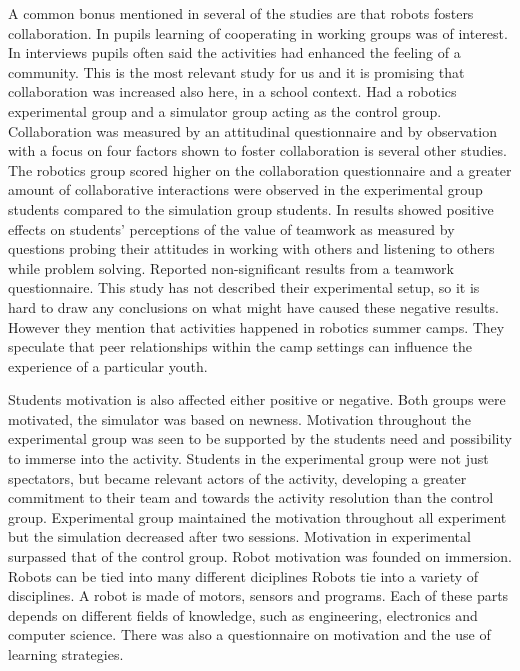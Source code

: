 A common bonus mentioned in several of the studies are that robots fosters collaboration. In \cite{lindh2007does} pupils learning of cooperating in working groups was of interest. In interviews pupils often said the activities had enhanced the feeling of a community. This is the most relevant study for us and it is promising that collaboration was increased also here, in a school context. \cite{mitnik2009collaborative} Had a robotics experimental group and a simulator group acting as the control group. Collaboration was measured by an attitudinal questionnaire and by observation with a focus on four factors shown to foster collaboration is several other studies. The robotics group scored higher on the collaboration questionnaire and a greater amount of collaborative interactions were observed in the experimental group students compared to the simulation group students. In \cite{nugent2008effect} results showed positive effects on students' perceptions of the value of teamwork as measured by questions probing their attitudes in working with others and listening to others while problem solving. \cite{nugent2009use} Reported non-significant results from a teamwork questionnaire. This study has not described their experimental setup, so it is hard to draw any conclusions on what might have caused these negative results. However they mention that activities happened in robotics summer camps. They speculate that peer relationships within the camp settings can influence the experience of a particular youth.

\bigskip\noindent
Students motivation is also affected either positive or negative.
\cite{mitnik2009collaborative} Both groups were motivated, the simulator was based on newness. Motivation throughout the experimental group was seen to be supported by the students need and possibility to immerse into the activity. Students in the experimental group were not just spectators, but became relevant actors of the activity, developing a greater commitment to their team and towards the activity resolution than the control group. Experimental group maintained the motivation throughout all experiment but the simulation decreased after two sessions. 
\cite{mitnik2009collaborative}Motivation in experimental surpassed that of the control group. Robot motivation was founded on immersion.
Robots can be tied into many different diciplines
\cite{barker2007robotics} Robots tie into a variety of disciplines. A robot is made of motors, sensors and programs. Each of these parts depends on different fields of knowledge, such as engineering, electronics and computer science. 
\cite{nugent2008effect} There was also a questionnaire on motivation and the use of learning strategies.

